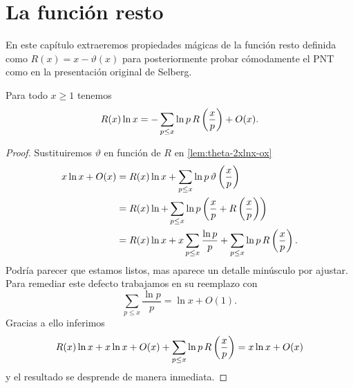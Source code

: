 \setlength{\headheight}{14.61858pt}
\pagestyle{fancy}

\chapter[La funci\'on resto]
{La funci\'on resto}
\label{ch:remainder}

En este cap\'itulo extraeremos propiedades m\'agicas
de la funci\'on resto definida como \(R(x) = x - \vartheta(x)\)
\cite[secci\'on 3]{Selberg1949}
para posteriormente probar c\'omodamente el PNT
como en la presentaci\'on original de Selberg.

\begin{lemma}
    \label{lem:rlnx1}
    Para todo \(x \geq 1\) tenemos
    \[
        R(x) \ln x = -\sum_{p \leq x} \ln p \, R \left( \frac{x}{p} \right) + O(x).
    \]
\end{lemma}

\begin{proof}
    Sustituiremos \(\vartheta\) en funci\'on de \(R\) en \cref{lem:theta-2xlnx-ox}
    \begin{align*}
        x\ln x + O(x)
        &= R(x) \ln x
        + \sum_{p \leq x} \ln p \, \vartheta \left( \frac{x}{p} \right) \\
        &= R(x) \ln
        + \sum_{p \leq x} \ln p \left( \frac{x}{p}
        + R\left( \frac{x}{p} \right) \right) \\
        &= R(x) \ln x
        + x \sum_{p \leq x} \frac{\ln p}{p}
        + \sum_{p \leq x} \ln p \, R \left( \frac{x}{p} \right).
    \end{align*}
    Podr\'ia parecer que estamos listos, mas aparece un detalle min\'usculo por ajustar.
    Para remediar este defecto trabajamos en su reemplazo con \cite[teorema 2]{Mertens1874}
    \[
        \sum_{p \leq x} \frac{\ln p}{p} = \ln x + O(1).
    \]
    Gracias a ello inferimos
    \[
        R(x) \ln x + x \ln x + O(x)
        + \sum_{p \leq x} \ln p \, R \left( \frac{x}{p} \right)
        = x \ln x + O(x)
    \]
    y el resultado se desprende de manera inmediata.
\end{proof}
